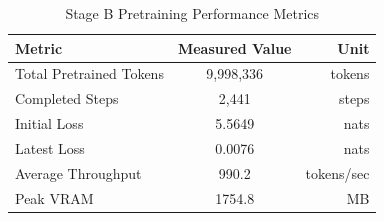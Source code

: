 \begin{table}[h]
\centering
\caption{Stage B Pretraining Performance Metrics}
\label{tab:stage_b_metrics}
\begin{tabular}{lcr}
\hline
\textbf{Metric} & \textbf{Measured Value} & \textbf{Unit} \\
\hline
Total Pretrained Tokens & 9,998,336 & tokens \\
Completed Steps & 2,441 & steps \\
Initial Loss & 5.5649 & nats \\
Latest Loss & 0.0076 & nats \\
Average Throughput & 990.2 & tokens/sec \\
Peak VRAM & 1754.8 & MB \\
\hline
\end{tabular}
\end{table}
